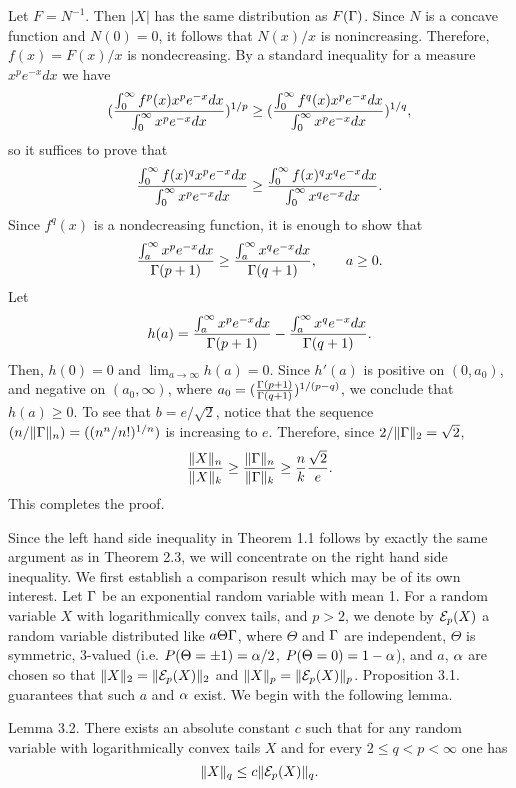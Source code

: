 \pf
Let $F=N^{-1}$. Then $|X|$ has the same distribution as $F(\Gamma)$. Since $N$
is a concave function and $N(0)=0$, it follows that $N(x)/x$ is
nonincreasing. Therefore, $f(x)=F(x)/x$ is nondecreasing. By a standard
inequality for a measure
$x^{p} e^{-x} dx$ we have
$$(
{\int_{0}^{\infty} f^{p}(x) x^{p} e^{-x} dx\over\int_{0}^{\infty} x^{p}
e^{-x} dx})^{1/p} \geq
(
{\int_{0}^{\infty} f^{q}(x) x^{p} e^{-x} dx\over\int_{0}^{\infty} x^{p}
e^{-x} dx})^{1/q}, $$
so it suffices to prove that
$$
{\int_{0}^{\infty} f(x)^{q} x^{p} e^{-x} dx\over\int_{0}^{\infty} x^{p}
e^{-x} dx}
\geq
{\int_{0}^{\infty} f(x)^{q} x^{q} e^{-x} dx\over\int_{0}^{\infty} x^{q}
e^{-x} dx}.
$$
Since $f^{q}(x)$ is a nondecreasing function, it is enough to show that $$
{\int_{a}^{\infty} x^{p} e^{-x} dx\over\Gamma (p+1)} \geq
{\int_{a}^{\infty} x^{q} e^{-x} dx\over\Gamma (q+1)},\qquad a\ge0. $$
Let $$h(a)={\int_{a}^{\infty} x^{p} e^{-x} dx\over\Gamma (p+1)} -
{\int_{a}^{\infty} x^{q} e^{-x} dx\over\Gamma (q+1)}. $$
Then, $h(0)=0$ and $\lim_{a\to\infty}h(a)=0$. Since $h'(a)$ is positive on
$(0,a_0)$, and negative on $(a_0,\infty)$, where $a_0=({\Gamma
(p+1)\over\Gamma (q+1)})^{1/(p-q)}$, we conclude that $h(a)\ge0$. To see
that $b=e/\sqrt2$, notice that the sequence $(n/\|\Gamma\|_n)=((n^n/n!)^{1/n})$
is increasing to $e$. Therefore, since $2/\|\Gamma\|_2=\sqrt2$,
$${\|X\|_n\over\|X\|_k}\ge{\|\Gamma\|_n\over\|\Gamma\|_k}\ge {n\over k}{\sqrt2\over
e}.$$ This completes the proof.

\bigskip

Since the left hand side inequality in Theorem 1.1
follows by exactly the same argument as
in Theorem 2.3, we will concentrate on the right hand side inequality.
We first establish a comparison result which may be of its own interest.
Let $\Gamma$ be an
exponential random variable with mean 1. For a random variable $X$ with 
logarithmically
convex tails, and $p>2$, we denote by ${\cal E}_p(X)$ a random variable
distributed like
$a\Theta\Gamma$, where $\Theta$ and $\Gamma$ are independent, $\Theta$ is
symmetric, 3-valued
(i.e. $P(\Theta=\pm 1)=\alpha/2$, $P(\Theta=0)=1-\alpha$), and $a$, $\alpha$ are chosen
so that
$\|X\|_2=\|{\cal E}_p(X)\|_2$ and $\|X\|_p=\|{\cal E}_p(X)\|_p$.
Proposition 3.1. guarantees that such $a$ and $\alpha$ exist. We begin with the
following
lemma.


\proclaim Lemma 3.2. There exists an absolute constant $c$ such that for
any random variable with logarithmically
convex tails $X$ and for every $2\le q<p<\infty$ one has $$\|X\|_q\le
c\|{\cal E}_p(X)\|_q.$$

